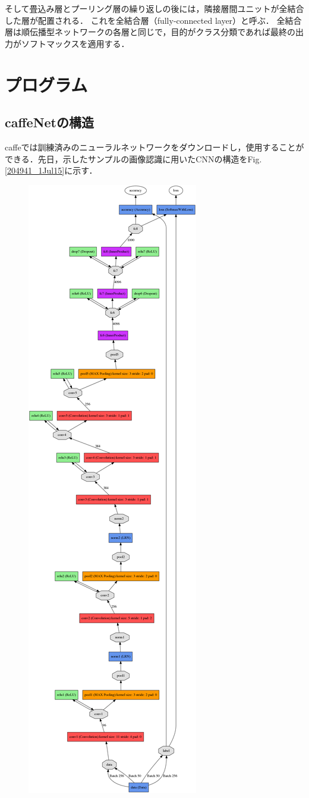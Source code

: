 \documentclass[a4paper,10pt]{jsarticle}
\begin{document}
そして畳込み層とプーリング層の繰り返しの後には，隣接層間ユニットが全結合した層が配置される．
これを全結合層（fully-connected layer）と呼ぶ．
全結合層は順伝播型ネットワークの各層と同じで，目的がクラス分類であれば最終の出力がソフトマックスを適用する．


\section{プログラム}
\subsection{caffeNetの構造}
caffeでは訓練済みのニューラルネットワークをダウンロードし，使用することができる．先日，示したサンプルの画像認識に用いたCNNの構造をFig.\ref{204941_1Jul15}に示す．
\begin{figure}[t]
 \centering
 \includegraphics[scale=0.2]{fig/png/caffeNet.png}

\end{figure}
\end{document}
